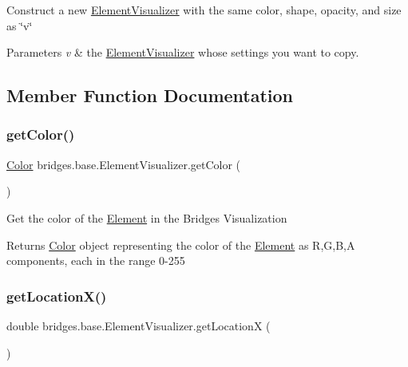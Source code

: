 Construct a new \mbox{\hyperlink{classbridges_1_1base_1_1_element_visualizer}{Element\+Visualizer}} with the same color, shape, opacity, and size as \char`\"{}v\char`\"{}


\begin{DoxyParams}{Parameters}
{\em v} & the \mbox{\hyperlink{classbridges_1_1base_1_1_element_visualizer}{Element\+Visualizer}} whose settings you want to copy. \\
\hline
\end{DoxyParams}


\subsection{Member Function Documentation}
\mbox{\label{classbridges_1_1base_1_1_element_visualizer_a3bf821b9bfa02746882bac934ce4fb8e}} 
\subsubsection{\texorpdfstring{getColor()}{getColor()}}
{\footnotesize\ttfamily \mbox{\hyperlink{classbridges_1_1base_1_1_color}{Color}} bridges.\+base.\+Element\+Visualizer.\+get\+Color (\begin{DoxyParamCaption}{ }\end{DoxyParamCaption})}

Get the color of the \mbox{\hyperlink{classbridges_1_1base_1_1_element}{Element}} in the Bridges Visualization

\begin{DoxyReturn}{Returns}
\mbox{\hyperlink{classbridges_1_1base_1_1_color}{Color}} object representing the color of the \mbox{\hyperlink{classbridges_1_1base_1_1_element}{Element}} as R,G,B,A components, each in the range 0-\/255 
\end{DoxyReturn}
\mbox{\label{classbridges_1_1base_1_1_element_visualizer_aec8d0e757d323ff6122a2e05ab89f852}} 
\subsubsection{\texorpdfstring{getLocationX()}{getLocationX()}}
{\footnotesize\ttfamily double bridges.\+base.\+Element\+Visualizer.\+get\+LocationX (\begin{DoxyParamCaption}{ }\end{DoxyParamCaption})}



